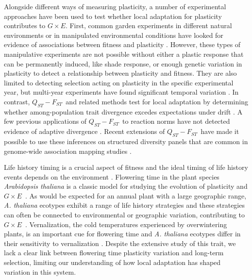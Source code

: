 \documentclass[11pt,letterpaper]{article}
\newcommand{\gxe}{$G \times E$}
\newcommand{\qf}{$Q_{ST}-F_{ST}$}
\begin{document}
Alongside different ways of measuring plasticity, a number of experimental approaches have been used to test whether local adaptation for plasticity contributes to \gxe.
First, common garden experiments in different natural environments or in manipulated environmental conditions have looked for evidence of associations between fitness and plasticity \citep{stinchcombe2004flowering, scheiner1999measuring, dudley1996testing, baythavong2010characterizing}.
However, these types of manipulative experiments are not possible without either a plastic response that can be permanently induced, like shade response, or enough genetic variation in plasticity to detect a relationship between plasticity and fitness.
They are also limited to detecting selection acting on plasticity in the specific experimental year, but multi-year experiments have found significant temporal variation \citep{oakley2023ecological}.
In contrast, \qf\ and related methods test for local adaptation by determining whether among-population trait divergence excedes expectations under drift \citep{prout1993f, spitze1993population, whitlock2008evolutionary, ovaskainen2011new, karhunen2013driftsel}.
A few previous applications of \qf\ to reaction norms have not detected evidence of adaptive divergence \citep{von2008partitioning,de2016evolution,lind2011gene}.
Recent extensions of \qf\ have made it possible to use these inferences on structured diversity panels that are common in genome-wide association mapping studies \citep{Josephs2019}.

Life history timing is a crucial aspect of fitness and the ideal timing of life history events depends on the environment \citep{worthy2025accelerated, aagren2017adaptive, colautti2013rapid}.
Flowering time in the plant species \textit{Arabidopsis thaliana} is a classic model for studying the evolution of plasticity and \gxe\  \citep{mitchell2006genetic, maple2024flowering, leventhal2025planting}.
As would be expected for an annual plant with a large geographic range, \textit{A. thaliana} ecotypes exhibit a range of life history strategies and these strategies can often be connected to environmental or geographic variation, contributing to \gxe\ \citep{stinchcombe2004latitudinal, mitchell2006genetic, hancock2011adaptation,martinez2020functional}.
Vernalization, the cold temperatures experienced by overwintering plants, is an important cue for flowering time and \textit{A. thaliana} ecotypes differ in their sensitivity to vernalization \citep{shindo2006variation, sung2005remembering}.
Despite the extensive study of this trait, we lack a clear link between flowering time plasticity variation and long-term selection, limiting our understanding of how local adaptation has shaped variation in this system.
\end{document}

